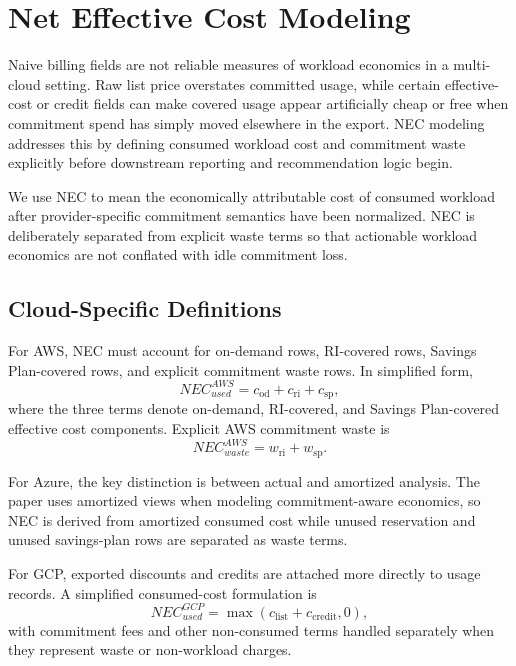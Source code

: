 \section{Net Effective Cost Modeling}
\label{sec:nec}

Naive billing fields are not reliable measures of workload economics in a multi-cloud setting. Raw list price overstates committed usage, while certain effective-cost or credit fields can make covered usage appear artificially cheap or free when commitment spend has simply moved elsewhere in the export. NEC modeling addresses this by defining consumed workload cost and commitment waste explicitly before downstream reporting and recommendation logic begin.

We use NEC to mean the economically attributable cost of consumed workload after provider-specific commitment semantics have been normalized. NEC is deliberately separated from explicit waste terms so that actionable workload economics are not conflated with idle commitment loss.

\subsection{Cloud-Specific Definitions}
For AWS, NEC must account for on-demand rows, RI-covered rows, Savings Plan-covered rows, and explicit commitment waste rows. In simplified form,
\begin{equation}
NEC^{AWS}_{used} = c_{\mathrm{od}} + c_{\mathrm{ri}} + c_{\mathrm{sp}},
\end{equation}
where the three terms denote on-demand, RI-covered, and Savings Plan-covered effective cost components. Explicit AWS commitment waste is
\begin{equation}
NEC^{AWS}_{waste} = w_{\mathrm{ri}} + w_{\mathrm{sp}}.
\end{equation}

For Azure, the key distinction is between actual and amortized analysis. The paper uses amortized views when modeling commitment-aware economics, so NEC is derived from amortized consumed cost while unused reservation and unused savings-plan rows are separated as waste terms.

For GCP, exported discounts and credits are attached more directly to usage records. A simplified consumed-cost formulation is
\begin{equation}
NEC^{GCP}_{used} = \max(c_{\mathrm{list}} + c_{\mathrm{credit}}, 0),
\end{equation}
with commitment fees and other non-consumed terms handled separately when they represent waste or non-workload charges.


